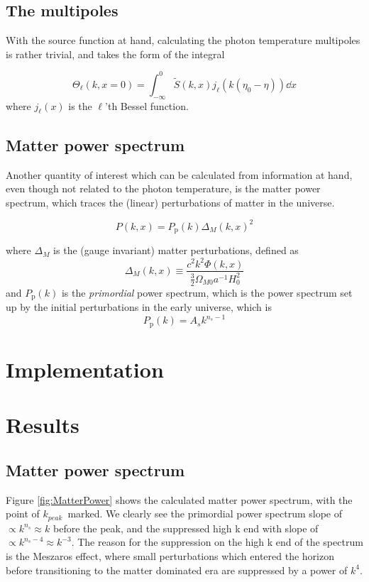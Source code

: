\documentclass[10pt, a4paper]{article}
\begin{document}
\subsection{The multipoles}
With the source function at hand, calculating the photon temperature multipoles is rather trivial, and takes the form of the integral

\begin{equation}
    \Theta_{\ell}(k, x=0)=\int_{-\infty}^{0} \tilde{S}(k, x) j_{\ell}\left(k\left(\eta_{0}-\eta\right)\right) \dd{x}
\end{equation}
where $j_\ell(x)$ is the $\ell$'th Bessel function.


\subsection{Matter power spectrum}
Another quantity of interest which can be calculated from information at hand, even though not related to the photon temperature, is the matter power spectrum, which traces the (linear) perturbations of matter in the universe.

\begin{equation}
    P(k, x) = P_{\text {p}}(k) \Delta_{M}(k, x)^{2}
\end{equation}

where $\Delta_M$ is the (gauge invariant) matter perturbations, defined as
\begin{equation}
    \Delta_{M}(k, x) \equiv \frac{c^{2} k^{2} \Phi(k, x)}{\frac{3}{2} \Omega_{M 0} a^{-1} H_{0}^{2}}
\end{equation}
and $P_\text{p}(k)$ is the \textit{primordial} power spectrum, which is the power spectrum set up by the initial perturbations in the early universe, which is
\begin{equation}
    P_\text{p}(k) = A_s k^{n_s-1}
\end{equation}



\section{Implementation}


\section{Results}
\subsection{Matter power spectrum}
Figure \ref{fig:MatterPower} shows the calculated matter power spectrum, with the point of $k_{peak}$ marked. We clearly see the primordial power spectrum slope of $\propto k^{n_s} \approx k$ before the peak, and the suppressed high k end with slope of $\propto k^{n_s-4} \approx k^{-3}$. The reason for the suppression on the high k end of the spectrum is the Meszaros effect, where small perturbations which entered the horizon before transitioning to the matter dominated era are suppressed by a power of $k^4$.
\end{document}
